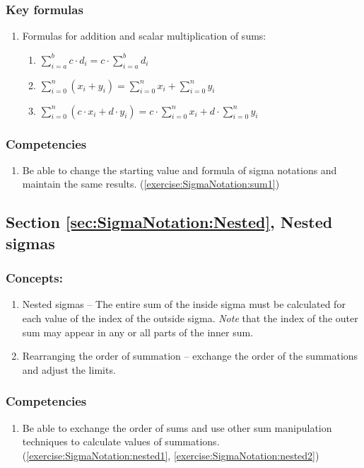 \subsubsection*{Key formulas}
\begin{enumerate}
\item
Formulas for addition and scalar multiplication of sums: 
\begin{enumerate}
\item
$\displaystyle{\sum_{i=a}^{b} c \cdot d_{i} = c \cdot \sum_{i=a}^{b}  d_{i}}$
\item
$\displaystyle{\sum_{i=0}^{n} \left(x_{i} +y_{i} \right) = \sum_{i=0}^{n} x_{i} + \sum_{i=0}^{n} y_{i}}$
\item
$\displaystyle{\sum_{i=0}^{n} \left(c \cdot x_{i} + d \cdot y_{i} \right) = c \cdot \sum_{i=0}^{n} x_{i} + d \cdot \sum_{i=0}^{n} y_{i}}$
\end{enumerate}
\end{enumerate}

\subsubsection*{Competencies}
\begin{enumerate}
\item
Be able to change the starting value and formula of sigma notations and maintain the same results. (\ref{exercise:SigmaNotation:sum1})
\end{enumerate}


\subsection*{Section \ref{sec:SigmaNotation:Nested}, Nested sigmas}
\subsubsection*{Concepts:}
\begin{enumerate}
\item 
Nested sigmas -- The entire sum of the inside sigma must be calculated for each value of the index of the outside sigma. \emph{Note} that the index of the outer sum may appear in any or all parts of the inner sum.
\item
Rearranging the order of summation -- exchange the order of the summations and adjust the limits. 
\end{enumerate}

\subsubsection*{Competencies}
\begin{enumerate}
\item
Be able to exchange the order of sums and use other sum manipulation techniques to calculate values of summations. (\ref{exercise:SigmaNotation:nested1}, \ref{exercise:SigmaNotation:nested2})
\end{enumerate}


